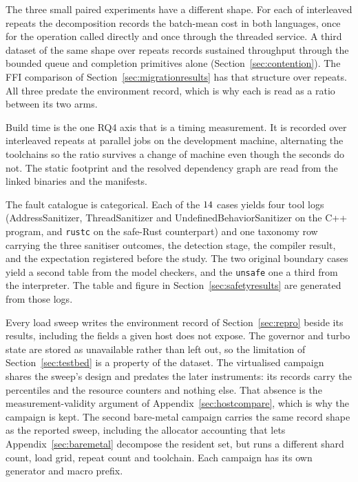 \documentclass[english,oneside,a4paper,censored,csm,software-track-2020]{HYthesisML}
\begin{document}
\begin{appendices}
The three small paired experiments have a different shape. For each of \BudgetRepeats{}
interleaved repeats the decomposition records the batch-mean cost in both languages, once for
the operation called directly and once through the threaded service. A third dataset of the same
shape over \ContentionRepeats{} repeats records sustained throughput through the bounded queue and
completion primitives alone (Section~\ref{sec:contention}). The FFI comparison of
Section~\ref{sec:migrationresults} has that structure over \FfiOpRepeats{} repeats. All three
predate the environment record, which is why each is read as a ratio between its two arms.

Build time is the one RQ4 axis that is a timing measurement. It is recorded over
\AdoptRepeats{} interleaved repeats at \AdoptJobs{} parallel jobs on the development machine,
alternating the toolchains so the ratio survives a change of machine even though the seconds do
not. The static footprint and the resolved dependency graph are read from the linked binaries
and the manifests.

The fault catalogue is categorical. Each of the $14$ cases yields four tool logs
(AddressSanitizer, ThreadSanitizer and UndefinedBehaviorSanitizer on the C++ program, and
\texttt{rustc} on the safe-Rust counterpart) and one taxonomy row carrying the three sanitiser
outcomes, the detection stage, the compiler result, and the expectation registered before the
study. The two original boundary cases yield a second table from the model checkers, and the
\texttt{unsafe} one a third from the interpreter. The table and figure in
Section~\ref{sec:safetyresults} are generated from those logs.

Every load sweep writes the environment record of Section~\ref{sec:repro} beside its results,
including the fields a given host does not expose. The governor and turbo state are stored as
unavailable rather than left out, so the limitation of Section~\ref{sec:testbed} is a property
of the dataset. The virtualised campaign shares the sweep's design and predates the later
instruments: its records carry the percentiles and the resource counters and nothing else. That
absence is the measurement-validity argument of Appendix~\ref{sec:hostcompare}, which is why the
campaign is kept. The second bare-metal campaign carries the same record shape as the reported
sweep, including the allocator accounting that lets Appendix~\ref{sec:baremetal} decompose the
resident set, but runs a different shard count, load grid, repeat count and toolchain. Each
campaign has its own generator and macro prefix.


\end{appendices}
\end{document}
